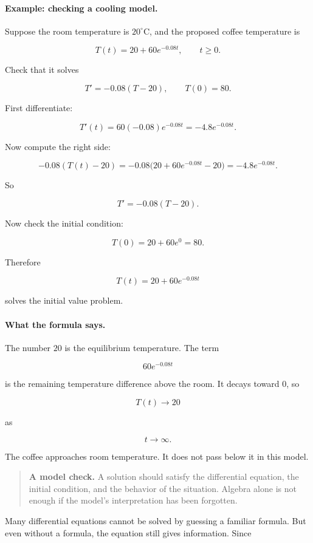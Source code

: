 \paragraph{Example: checking a cooling model.}
Suppose the room temperature is \(20^\circ\text{C}\), and the proposed coffee
temperature is

\[
T(t)=20+60e^{-0.08t},
\qquad t\ge0.
\]

Check that it solves

\[
T'=-0.08(T-20),
\qquad
T(0)=80.
\]

First differentiate:

\[
T'(t)=60(-0.08)e^{-0.08t}=-4.8e^{-0.08t}.
\]

Now compute the right side:

\[
-0.08(T(t)-20)
=
-0.08\bigl(20+60e^{-0.08t}-20\bigr)
=
-4.8e^{-0.08t}.
\]

So

\[
T'=-0.08(T-20).
\]

Now check the initial condition:

\[
T(0)=20+60e^0=80.
\]

Therefore

\[
\boxed{
T(t)=20+60e^{-0.08t}
}
\]

solves the initial value problem.

\paragraph{What the formula says.}
The number \(20\) is the equilibrium temperature.  The term

\[
60e^{-0.08t}
\]

is the remaining temperature difference above the room.  It decays toward \(0\), so

\[
T(t)\to20
\]

as

\[
t\to\infty.
\]

The coffee approaches room temperature.  It does not pass below it in this model.

\begin{quote}
\textbf{A model check.}
A solution should satisfy the differential equation, the initial condition, and the
behavior of the situation.  Algebra alone is not enough if the model's interpretation
has been forgotten.
\end{quote}

Many differential equations cannot be solved by guessing a familiar formula.  But even
without a formula, the equation still gives information.  Since

